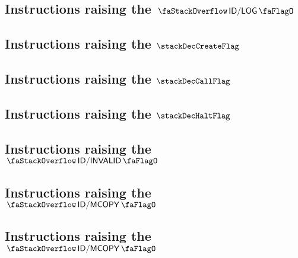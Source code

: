 \subsection{Instructions raising the $\stackDecLogFlag$           \lispDone{}}   \label{hub: instruction handling: log}                    
\subsection{Instructions raising the $\stackDecCreateFlag$        \lispDone{}}   \label{hub: instruction handling: create}                 
\subsection{Instructions raising the $\stackDecCallFlag$          \lispDone{}}   \label{hub: instruction handling: call}                   
\subsection{Instructions raising the $\stackDecHaltFlag$          \lispDone{}}   \label{hub: instruction handling: halt}                   
\subsection{Instructions raising the $\stackDecInvalidFlag$       \lispDone{}}   \label{hub: instruction handling: invalid}                
\subsection{Instructions raising the $\stackDecMcopyFlag$         \lispDone{}}   \label{hub: instruction handling: mcopy}                  
\subsection{Instructions raising the $\stackDecMcopyFlag$         \lispTodo{}}   \label{hub: instruction handling: mcopy}                  
